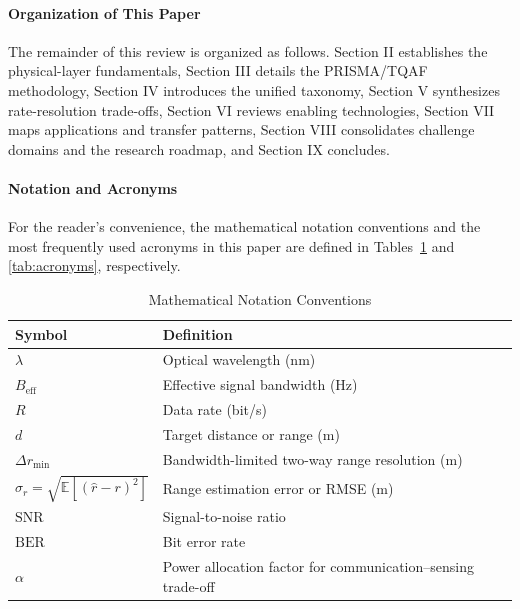 \documentclass[letterpaper,journal]{IEEEtran}
\begin{document}
\paragraph{Organization of This Paper}

The remainder of this review is organized as follows. Section II establishes the physical-layer fundamentals, Section III details the PRISMA/TQAF methodology, Section IV introduces the unified taxonomy, Section V synthesizes rate-resolution trade-offs, Section VI reviews enabling technologies, Section VII maps applications and transfer patterns, Section VIII consolidates challenge domains and the research roadmap, and Section IX concludes.


\paragraph{Notation and Acronyms}

For the reader's convenience, the mathematical notation conventions and the most frequently used acronyms in this paper are defined in Tables~\ref{tab:math_notation} and \ref{tab:acronyms}, respectively.
\begin{table}[!t]
    \caption{Mathematical Notation Conventions}
    \label{tab:math_notation}
    \centering
    \footnotesize
    \begin{tabularx}{\columnwidth}{@{}>{\raggedright\arraybackslash}p{} >{\raggedright\arraybackslash}X@{}}
        \toprule
        \textbf{Symbol}                                & \textbf{Definition}                                          \\
        \midrule
        $\lambda$                                      & Optical wavelength (nm)                                      \\
        $B_{\mathrm{eff}}$                             & Effective signal bandwidth (Hz)                              \\
        $R$                                            & Data rate (bit/s)                                            \\
        $d$                                            & Target distance or range (m)                                 \\
        $\Delta r_{\min}$                              & Bandwidth-limited two-way range resolution (m)               \\
        $\sigma_r = \sqrt{\mathbb{E}[(\hat r - r)^2]}$ & Range estimation error or RMSE (m)                           \\
        $\mathrm{SNR}$                                 & Signal-to-noise ratio                                        \\
        $\mathrm{BER}$                                 & Bit error rate                                               \\
        $\alpha$                                       & Power allocation factor for communication--sensing trade-off \\
        \bottomrule
    \end{tabularx}
\end{table}
\end{document}
